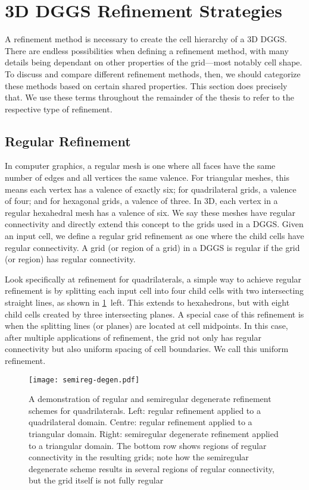 \section{3D DGGS Refinement Strategies} \label{chap:3:refinement}
A refinement method is necessary to create the cell hierarchy of a 3D DGGS.
There are endless possibilities when defining a refinement method, with many details being dependant on other properties of the grid---most notably cell shape.
To discuss and compare different refinement methods, then, we should categorize these methods based on certain shared properties.
This section does precisely that.
We use these terms throughout the remainder of the thesis to refer to the respective type of refinement.


\subsection{Regular Refinement} \label{chap:3:regular}
In computer graphics, a regular mesh is one where all faces have the same number of edges and all vertices the same valence.
For triangular meshes, this means each vertex has a valence of exactly six; for quadrilateral grids, a valence of four; and for hexagonal grids, a valence of three.
In 3D, each vertex in a regular hexahedral mesh has a valence of six.
We say these meshes have regular connectivity and directly extend this concept to the grids used in a DGGS.
Given an input cell, we define a regular grid refinement as one where the child cells have regular connectivity.
A grid (or region of a grid) in a DGGS is regular if the grid (or region) has regular connectivity. 


Look specifically at refinement for quadrilaterals, a simple way to achieve regular refinement is by splitting each input cell into four child cells with two intersecting straight lines, as shown in \cref{fig:semireg-degen}~left.
This extends to hexahedrons, but with eight child cells created by three intersecting planes.
A special case of this refinement is when the splitting lines (or planes) are located at cell midpoints.
In this case, after multiple applications of refinement, the grid not only has regular connectivity but also uniform spacing of cell boundaries.
We call this uniform refinement.


\begin{figure}[ht!]
	\centering
	\texttt{[image: semireg-degen.pdf]}
	\caption[Comparison of regular and semiregular degenerate refinement]{
		A demonstration of regular and semiregular degenerate refinement schemes for quadrilaterals.
		Left: regular refinement applied to a quadrilateral domain.
		Centre: regular refinement applied to a triangular domain.
		Right: semiregular degenerate refinement applied to a triangular domain.
		The bottom row shows regions of regular connectivity in the resulting grids; note how the semiregular degenerate scheme results in several regions of regular connectivity, but the grid itself is not fully regular
	}
	\label{fig:semireg-degen}
\end{figure}


